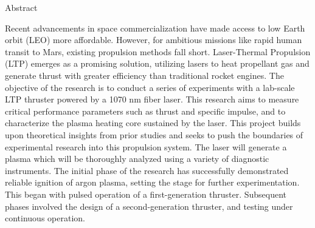 \begin{plainchp}{Abstract}

    Recent advancements in space commercialization have made access to low Earth orbit (LEO) more affordable. However, for ambitious missions like rapid human transit to Mars, existing propulsion methods fall short. Laser-Thermal Propulsion (LTP) emerges as a promising solution, utilizing lasers to heat propellant gas and generate thrust with greater efficiency than traditional rocket engines. The objective of the research is to conduct a series of experiments with a lab-scale LTP thruster powered by a 1070 nm fiber laser. This research aims to measure critical performance parameters such as thrust and specific impulse, and to characterize the plasma heating core sustained by the laser. This project builds upon theoretical insights from prior studies and seeks to push the boundaries of experimental research into this propulsion system. The laser will generate a plasma which will be thoroughly analyzed using a variety of diagnostic instruments. The initial phase of the research has successfully demonstrated reliable ignition of argon plasma, setting the stage for further experimentation. This began with pulsed operation of a first-generation thruster. Subsequent phases involved the design of a second-generation thruster, and testing under continuous operation.

\end{plainchp}